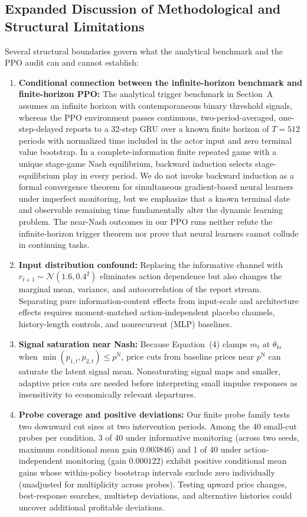 \documentclass{article}
\begin{document}
\subsection{Expanded Discussion of Methodological and Structural Limitations}

Several structural boundaries govern what the analytical benchmark and the PPO audit can and cannot establish:
\begin{enumerate}
\item \textbf{Conditional connection between the infinite-horizon benchmark and finite-horizon PPO:} The analytical trigger benchmark in Section~A assumes an infinite horizon with contemporaneous binary threshold signals, whereas the PPO environment passes continuous, two-period-averaged, one-step-delayed reports to a 32-step GRU over a known finite horizon of $T=512$ periods with normalized time included in the actor input and zero terminal value bootstrap. In a complete-information finite repeated game with a unique stage-game Nash equilibrium, backward induction selects stage-equilibrium play in every period. We do not invoke backward induction as a formal convergence theorem for simultaneous gradient-based neural learners under imperfect monitoring, but we emphasize that a known terminal date and observable remaining time fundamentally alter the dynamic learning problem. The near-Nash outcomes in our PPO runs neither refute the infinite-horizon trigger theorem nor prove that neural learners cannot collude in continuing tasks.
\item \textbf{Input distribution confound:} Replacing the informative channel with $r_{t+1}\sim\mathcal{N}(1.6,0.4^2)$ eliminates action dependence but also changes the marginal mean, variance, and autocorrelation of the report stream. Separating pure information-content effects from input-scale and architecture effects requires moment-matched action-independent placebo channels, history-length controls, and nonrecurrent (MLP) baselines.
\item \textbf{Signal saturation near Nash:} Because Equation~(4) clamps $m_t$ at $\theta_{\mathrm{lo}}$ when $\min(p_{1,t},p_{2,t})\leq p^{\mathrm{N}}$, price cuts from baseline prices near $p^{\mathrm{N}}$ can saturate the latent signal mean. Nonsaturating signal maps and smaller, adaptive price cuts are needed before interpreting small impulse responses as insensitivity to economically relevant departures.
\item \textbf{Probe coverage and positive deviations:} Our finite probe family tests two downward cut sizes at two intervention periods. Among the 40 small-cut probes per condition, 3 of 40 under informative monitoring (across two seeds, maximum conditional mean gain $0.003846$) and 1 of 40 under action-independent monitoring (gain $0.000122$) exhibit positive conditional mean gains whose within-policy bootstrap intervals exclude zero individually (unadjusted for multiplicity across probes). Testing upward price changes, best-response searches, multistep deviations, and alternative histories could uncover additional profitable deviations.

\end{enumerate}
\end{document}
